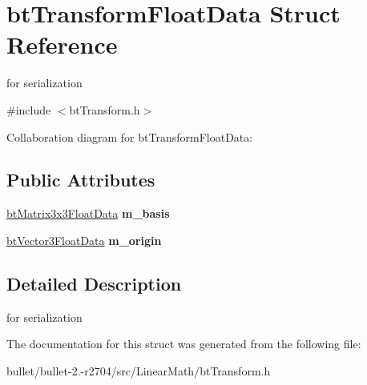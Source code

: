\hypertarget{structbt_transform_float_data}{\section{bt\+Transform\+Float\+Data Struct Reference}
\label{structbt_transform_float_data}
}


for serialization  




{\ttfamily \#include $<$bt\+Transform.\+h$>$}



Collaboration diagram for bt\+Transform\+Float\+Data\+:
\subsection*{Public Attributes}
\begin{DoxyCompactItemize}
\item 
\hypertarget{structbt_transform_float_data_a1f93fd962387f5ec48cf9da7df3846ad}{\hyperlink{structbt_matrix3x3_float_data}{bt\+Matrix3x3\+Float\+Data} {\bfseries m\+\_\+basis}}\label{structbt_transform_float_data_a1f93fd962387f5ec48cf9da7df3846ad}

\item 
\hypertarget{structbt_transform_float_data_abd1afa5a43625ee98a0129bc041cadfb}{\hyperlink{structbt_vector3_float_data}{bt\+Vector3\+Float\+Data} {\bfseries m\+\_\+origin}}\label{structbt_transform_float_data_abd1afa5a43625ee98a0129bc041cadfb}

\end{DoxyCompactItemize}


\subsection{Detailed Description}
for serialization 

The documentation for this struct was generated from the following file\+:\begin{DoxyCompactItemize}
\item 
bullet/bullet-\/2.-\/r2704/src/\+Linear\+Math/bt\+Transform.\+h\end{DoxyCompactItemize}
